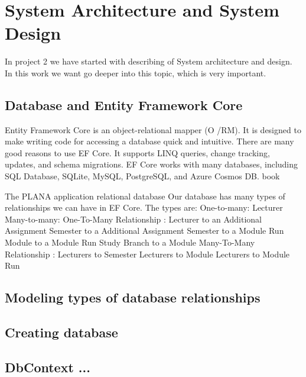 \documentclass{scrartcl}
\begin{document}
\section{System Architecture and System Design}
In project 2 we have started with describing of System architecture and design. In this work we want go deeper into this topic, which is very important. \\


\subsection{Database and Entity Framework Core}
Entity Framework Core is an object-relational mapper (O /RM). It is designed to make writing code for accessing a database quick and intuitive.
There are many good reasons to use EF Core. It supports LINQ queries, change tracking, updates, and schema migrations. EF Core works with many databases, including SQL Database, SQLite, MySQL, PostgreSQL, and Azure Cosmos DB.
book \cite{efa} \cite{ef}

The PLANA application relational database
Our database has many types of relationships we can have in EF Core. The types are:
One-to-many: Lecturer
Many-to-many:
One-To-Many Relationship : 
Lecturer to an Additional Assignment 
Semester to a Additional Assignment
Semester to a Module Run 
Module to a Module Run
Study Branch to a Module
Many-To-Many Relationship :
Lecturers to Semester
Lecturers to Module
Lecturers to Module Run




\subsection{Modeling types of database relationships}

\subsection{Creating database}

\subsection{DbContext ...}




\end{document}

